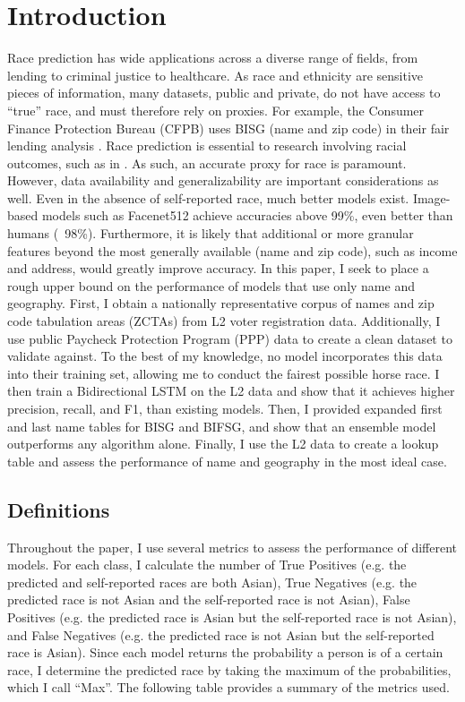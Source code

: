 \documentclass[12pt]{article}
\begin{document}
\doublespacing


\section{Introduction} \label{sec:introduction}

Race prediction has wide applications across a diverse range of fields, from lending to criminal justice to healthcare.
As race and ethnicity are sensitive pieces of information, many datasets, public and private, do not have access to
``true'' race, and must therefore rely on proxies. For example, the Consumer Finance Protection Bureau (CFPB) uses BISG (name and zip code) in their fair lending analysis \cite{cfpb2014}. Race prediction is essential to research involving racial outcomes, such as in \citep{brown2016,frame2022,clifford2023}. As such, an accurate proxy for race is paramount. However, data availability and
generalizability are important considerations as well. Even in the absence of self-reported race, much better models exist. Image-based models such as Facenet512 achieve accuracies above 99\%, even better than humans (~98\%). Furthermore, it is likely that additional or more granular features beyond the most generally available (name and zip code), such as income and address, would greatly improve accuracy. In this paper, I seek to place a rough upper bound on the performance of models that use only name and geography. First, I obtain a nationally representative corpus of names and zip code tabulation areas (ZCTAs) from L2 voter registration data. Additionally, I use public Paycheck Protection Program (PPP) data to create a clean dataset to validate against. To the best of my knowledge, no model incorporates this data into their training set, allowing me to conduct the fairest possible horse race. I then train a Bidirectional LSTM on the L2 data and show that it achieves higher precision, recall, and F1, than existing models. Then, I provided expanded first and last name tables for BISG and BIFSG, and show that an ensemble model outperforms any algorithm alone. Finally, I use the L2 data to create a lookup table and assess the performance of name and geography in the most ideal case.

\subsection{Definitions}

Throughout the paper, I use several metrics to assess the performance of different models. For each class, I calculate the number of True Positives (e.g. the predicted and self-reported races are both Asian), True Negatives (e.g. the predicted race is not Asian and the self-reported race is not Asian), False Positives (e.g. the predicted race is Asian but the self-reported race is not Asian), and False Negatives (e.g. the predicted race is not Asian but the self-reported race is Asian). Since each model returns the probability a person is of a certain race, I determine the predicted race by taking the maximum of the probabilities, which I call ``Max''. The following table provides a summary of the metrics used.
\end{document}
